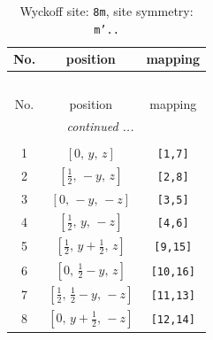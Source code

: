 \documentclass[fleqn,8pt]{jsarticle}
\begin{document}
\begin{longtable}{ccc}
\caption{Wyckoff site: {\tt 8m}, site symmetry: {\tt m'..}}
 \\
 \hline \hline
No. & position & mapping \\ \hline \endfirsthead

\multicolumn{2}{l}{\tablename\ \thetable{}} \\
 \hline \hline
No. & position & mapping \\ \hline \endhead

 \hline \hline
\multicolumn{2}{r}{\footnotesize\it continued ...} \\ \endfoot

 \hline \hline
\multicolumn{2}{r}{} \\ \endlastfoot

1 & $\left[ 0,\, y,\, z \right]$ & {\tt [1,7]} \\ \hline
2 & $\left[ \frac{1}{2},\, - y,\, z \right]$ & {\tt [2,8]} \\ \hline
3 & $\left[ 0,\, - y,\, - z \right]$ & {\tt [3,5]} \\ \hline
4 & $\left[ \frac{1}{2},\, y,\, - z \right]$ & {\tt [4,6]} \\ \hline
5 & $\left[ \frac{1}{2},\, y + \frac{1}{2},\, z \right]$ & {\tt [9,15]} \\ \hline
6 & $\left[ 0,\, \frac{1}{2} - y,\, z \right]$ & {\tt [10,16]} \\ \hline
7 & $\left[ \frac{1}{2},\, \frac{1}{2} - y,\, - z \right]$ & {\tt [11,13]} \\ \hline
8 & $\left[ 0,\, y + \frac{1}{2},\, - z \right]$ & {\tt [12,14]} \\
\end{longtable}
\renewcommand{\arraystretch}{1.2}
\end{document}
